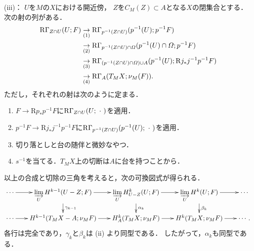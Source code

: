 \documentclass[uplatex,dvipdfmx,a4paper,10pt,draft]{jsarticle}
\makeatletter
\theoremstyle{definition}
\renewenvironment{proof}[1][\proofname]{\par
  \pushQED{\qed}%
  \normalfont \topsep6\p@\@plus6\p@\relax
  \trivlist
  \item[\hskip\labelsep
         \bfseries
    {#1}]\ignorespaces
}{%
  \popQED\endtrivlist\@endpefalse
}
\renewcommand{\proofname}{証明.}
\numberwithin{equation}{section}
\newcommand{\RG}{\mathop{\mathrm{R}\hspace{-0pt}\Gamma}\nolimits}
\newcommand{\Rder}{\mathrm{R}}
\newcommand{\indlim}[1][]{\mathop{\varinjlim}\limits_{#1}}
\newcommand{\blk}{\mathord{\ \cdot\ }}
\theoremstyle{mystyle}
\makeatother
\begin{document}
\begin{proof}
    (iii)：
    \(U\)を\(M\)の\(X\)における開近傍，
    \(Z\)を\(C_{M}(Z)\subset A\)となる\(X\)の閉集合とする．
    次の射の列がある．
    \begin{align*}
        \RG_{Z\cap U}(U;F)
        &\underset{(1)}{\to}\RG_{p^{-1}(Z\cap U)}(p^{-1}(U);p^{-1}F)\\
        &\underset{(2)}{\to}\RG_{p^{-1}(Z\cap U)\cap \varOmega}(p^{-1}(U)\cap \varOmega;p^{-1}F)\\
        &\underset{(3)}{\to}\RG_{(p^{-1}(Z\cap U)\cap \varOmega)\cup A}(p^{-1}(U);\Rder{j}_{\ast}j^{-1}p^{-1}F)\\
        &\underset{(4)}{\to}\RG_{A}(T_{M}X;\nu_{M}(F)).
    \end{align*}
    ただし，それぞれの射は次のように定まる．
    \begin{enumerate}[(1)]
        \item \(F\to \Rder{p}_{\ast}p^{-1}F\)に\(\RG_{Z\cap U}(U;\blk)\)を適用．
        \item \(p^{-1}F\to \Rder{j}_{\ast}j^{-1}p^{-1}F\)に\(\RG_{p^{-1}(Z\cap U)}(p^{-1}(U);\blk)\)を適用．
        \item 切り落としと台の随伴と微妙なやつ．
        \item \(s^{-1}\)を当てる．\(T_{M}X\)上の切断は\(A\)に台を持つことから．
    \end{enumerate}
    以上の合成と切除の三角を考えると，次の可換図式が得られる．
    \[    
        \vcenter{\xymatrix@C=18pt@R=18pt{
        \cdots
        \ar[r]
        &
        \indlim[U]H^{k-1}(U-Z;F)
        \ar[d]^-{\gamma_{k-1}}
        \ar[r]
        &
        \indlim[U]H^{k}_{U-Z}(U;F)
        \ar[r]
        \ar[d]^-{\alpha_k}
        &
        \indlim[U]H^{k}(U;F)
        \ar[r]
        \ar[d]^-{\beta_k}
        &
        \cdots
        \\
        \cdots
        \ar[r]
        &
        H^{k-1}(T_{M}X-A;\nu_{M}F)
        \ar[r]
        &
        H^{k}_{A}(T_{M}X;\nu_{M}F)
        \ar[r]
        &
        H^{k}(T_{M}X;\nu_{M}F)
        \ar[r]
        &
        \cdots.
      }}
    \]
    各行は完全であり，\(\gamma_k\)と\(\beta_k\)は (ii) より同型である．
    したがって，\(\alpha_k\)も同型である．


\end{proof}
\end{document}
